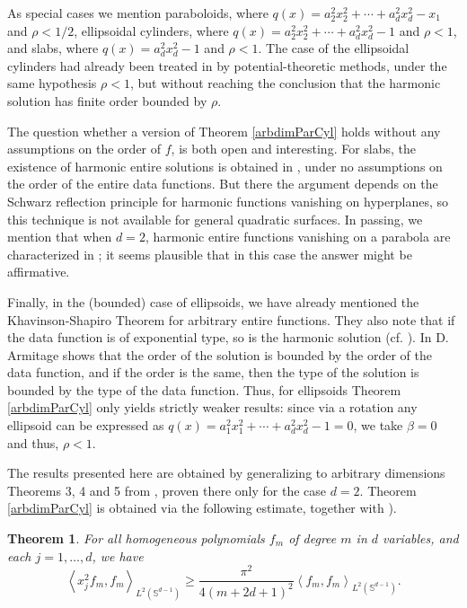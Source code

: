 \documentclass[12pt]{amsart}
\newtheorem{theorem}{Theorem}
\begin{document}
As special cases we mention paraboloids, where $q(x) =  a_2^2 x_{2}^{2}+\cdots +a_d^2 x_{d}^{2} - x_1$
and  $\rho < 1/2$, ellipsoidal cylinders, where $q(x) = a_2^2 x_{2}^{2}+\cdots +a_d^2 x_{d}^{2} - 1$
and  $\rho < 1$, and slabs, where $q(x) = a_d^2 x_{d}^{2} - 1$
and  $\rho < 1$. The case of the ellipsoidal cylinders had already been treated in  \cite{KLR17} by potential-theoretic methods, under the same hypothesis $\rho < 1$, but without reaching the conclusion that the
 harmonic solution has finite order bounded by $\rho$. 
 
 
 
 The question whether a version of Theorem \ref{arbdimParCyl}   holds without any assumptions  on the order of  $f$, is both open and interesting.  For slabs, the existence of harmonic entire solutions
 is obtained in \cite{KLR17b}, under no assumptions on the order of the entire data functions. But there the argument depends on the Schwarz  reflection principle for harmonic functions vanishing on  hyperplanes, so this technique is not available for general quadratic surfaces.  In passing, we mention that when  $d=2$, harmonic entire functions vanishing on a parabola  are characterized in  \cite[p. 427]{FNS66}; it seems plausible that in this case the answer might be affirmative.
 
 

 Finally, in the (bounded) case of ellipsoids, we have already mentioned the Khavinson-Shapiro Theorem for arbitrary entire functions. They also note that if the data function is of exponential type, so is the harmonic solution (cf. \cite[P. 459 Remarks]{KhSh92}). In \cite[Theorem 1]{Armi04} D. Armitage shows that the order of the solution is bounded by the order of the data function, and if the order is the same, then the type of the solution is bounded by the type of the data function.
 Thus, for ellipsoids Theorem \ref{arbdimParCyl} only yields strictly weaker results: since via a rotation any ellipsoid can be expressed as $q(x) = a_1^2 x_{1}^{2}+\cdots +a_d^2 x_{d}^{2} - 1= 0$,  we take $\beta = 0$ and thus, $\rho < 1$.
 
 The results presented here are obtained by generalizing to arbitrary dimensions Theorems 3, 4 and 5 from
 \cite{RendAl22}, proven there only for the case $d =2$. Theorem \ref{arbdimParCyl} is obtained via the following estimate, together with \cite[Theorem 1]{RendAl22}).
 
 
 
 \begin{theorem} \label{arbdimB}
 	For all homogeneous polynomials $
 	f_{m}$ of degree $m$ in $d$ variables, 
 	and each $j = 1, \dots , d$, we have
 	\begin{equation*}
 		\left\langle x_{j}^{2}f_{m},f_{m}\right\rangle _{L^{2}\left( \mathbb{S}
 			^{d-1}\right) }
 		\geq
 		\frac{\pi ^{2}}{4\left( m + 2 d + 1 \right)^{2}}
 		\left
 		\langle
 		f_{m},f_{m}\right\rangle _{L^{2}\left( \mathbb{S}^{d-1}\right) }.
 	\end{equation*}
 \end{theorem}  
 
\end{document}
